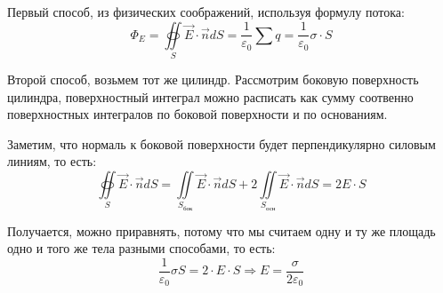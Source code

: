 \documentclass[../main.tex]{subfiles}
\begin{document}
Первый способ, из физических соображений, используя формулу потока:
\[ \Phi_E = \oiint\limits_S \vec E \cdot \vec n dS = \frac{1}{\varepsilon_0} \sum_{}^{} q
    = \frac{1}{\varepsilon_0} \sigma \cdot S \]

Второй способ, возьмем тот же цилиндр. Рассмотрим боковую поверхность цилиндра, поверхностный интеграл можно расписать как сумму соотвенно поверхностных интегралов по боковой поверхности и по основаниям.

\vspace{5px}

Заметим, что нормаль к боковой поверхности будет перпендикулярно силовым линиям, то есть:
\[ \oiint\limits_S \vec E \cdot \vec n dS = \iint\limits_{S_{\text{бок}}} \vec E \cdot \vec n dS + 2\iint\limits_{S_{\text{осн}}} \vec E \cdot \vec n dS
    = 2 E \cdot S \]

Получается, можно приравнять, потому что мы считаем одну и ту же площадь одно и того же тела разными способами, то есть:
\[\frac{1}{\varepsilon_0} \sigma S = 2 \cdot E \cdot S \Rightarrow E = \frac{\sigma}{2 \varepsilon_0}\]
\end{document}
